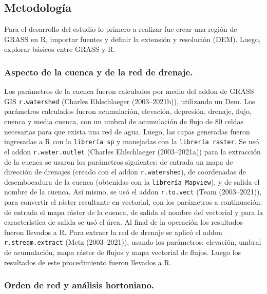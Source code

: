 \documentclass[11pt,]{article}
\begin{document}
\subsection{Metodología}\label{metodologuxeda}

Para el desarrollo del estudio lo primero a realizar fue crear una
región de GRASS en R, importar fuentes y definir la extensión y
resolución (DEM). Luego, explorar básicos entre GRASS y R.

\subsubsection{Aspecto de la cuenca y de la red de
drenaje.}\label{aspecto-de-la-cuenca-y-de-la-red-de-drenaje.}

Los parámetros de la cuenca fueron calculados por medio del addon de
GRASS GIS \texttt{r.watershed} (Charles Ehlschlaeger (2003--2021b)),
utilizando un Dem. Los parámetros calculados fueron acumulación,
elevación, depresión, drenaje, flujo, cuenca y media cuenca, con un
umbral de acumulación de flujo de 80 celdas necesarias para que exista
una red de agua. Luego, las capas generadas fueron ingresadas a R con la
\texttt{librería\ sp} y manejadas con la \texttt{librería\ raster}. Se
usó el addon \texttt{r.water.outlet} (Charles Ehlschlaeger
(2003--2021a)) para la extracción de la cuenca se usaron los parámetros
siguientes: de entrada un mapa de dirección de drenajes (creado con el
addon \texttt{r.watershed}), de coordenadas de desembocadura de la
cuenca (obtenidas con la \texttt{librería\ Mapview}), y de salida el
nombre de la cuenca. Así mismo, se usó el addon \texttt{r.to.vect} (Team
(2003--2021)), para convertir el ráster resultante en vectorial, con los
parámetros a continuación: de entrada el mapa ráster de la cuenca, de
salida el nombre del vectorial y para la característica de salida se usó
el área. Al final de la operación los resultados fueron llevados a R.
Para extraer la red de drenaje se aplicó el addon
\texttt{r.stream.extract} (Metz (2003--2021)), usando los parámetros:
elevación, umbral de acumulación, mapa ráster de flujos y mapa vectorial
de flujos. Luego los resultados de este procedimiento fueron llevados a
R.

\subsubsection{Orden de red y análisis
hortoniano.}\label{orden-de-red-y-anuxe1lisis-hortoniano.}
\end{document}

